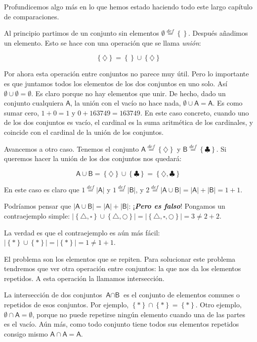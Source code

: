 \documentclass{amsart}
\theoremstyle{definition}
\theoremstyle{remark}
\numberwithin{equation}{section}
\newcommand{\abs}[1]{\left\lvert#1\right\rvert}
\newcommand{\set}[1]{\left\lbrace{#1}\right\rbrace}
\newcommand{\setsymbol}[1]{\textsf{#1}}
\newcommand{\sA}{\setsymbol{A}}
\newcommand{\sB}{\setsymbol{B}}
\newcommand{\card}[1]{\abs{#1}}
\newcommand{\defin}{\overset {def}{=}}
\begin{document}
	Profundicemos algo más en lo que hemos estado haciendo todo este largo 
capítulo de comparaciones.


	Al principio partimos de un conjunto sin elementos $\emptyset \defin 
\set{}$. Después añadimos un elemento. Esto se hace con una operación que se 
llama \emph{unión}:

$$
\set{\diamondsuit} = \set{} \cup \set{\diamondsuit}
$$


	Por ahora esta operación entre conjuntos no parece muy útil. Pero lo 
importante es que juntamos todos los elementos de los dos conjuntos en uno 
solo. Así $\emptyset \cup \emptyset = \emptyset$. Es claro porque no hay 
elementos que unir. De hecho, dado un conjunto cualquiera $\sA$, la unión con 
el vacío no hace nada, $\emptyset \cup \sA = \sA$. Es como sumar cero, $1+0 = 
1$ y $0 + 163749 = 163749$. En este caso concreto, cuando uno de los dos 
conjuntos es vacío, el cardinal es la suma aritmética de los cardinales, y 
coincide con el cardinal de la unión de los conjuntos.


	Avancemos a otro caso. Tenemos el conjunto $\sA \defin 
\set{\diamondsuit}$ y $\sB \defin \set{\clubsuit}$. Si queremos hacer la 
unión de los dos conjuntos nos quedará:


$$
\sA\cup\sB = \set{\diamondsuit}\cup\set{\clubsuit} = 
\set{\diamondsuit,\clubsuit}
$$


	En este caso es claro que $1 \defin \card{\sA}$ y $1 \defin \card{\sB}$, 
y $2 \defin \card{\sA\cup\sB} = \card{\sA}+\card{\sB} = 1 + 1$.


	Podríamos pensar que $\card{\sA\cup\sB}=\card{\sA}+\card{\sB}$: 
¡\textbf{\emph{Pero es falso}}! Pongamos un contraejemplo simple: $\card{ 
\set{ \triangle, \square} \cup \set{ \triangle, \bigcirc}} = \card{ \set{ 
\triangle,\square,\bigcirc} }=3\neq 2 + 2$.


	La verdad es que el contraejemplo es aún más fácil: $\card{ \set{*} \cup 
\set{*}} = \card{ \set{*} } = 1 \neq 1 + 1$.


	El problema son los elementos que se repiten. Para solucionar este 
problema tendremos que ver otra operación entre conjuntos: la que nos da los 
elementos repetidos. A esta operación la llamamos intersección.


	La intersección de dos conjuntos $\sA\cap\sB$ es el conjunto de elementos 
comunes o repetidos de esos conjuntos. Por ejemplo, $\set{*}\cap\set{*} = 
\set{*}$. Otro ejemplo, $\emptyset \cap \sA =  \emptyset$, porque no puede 
repetirse ningún elemento cuando una de las partes es el vacío. Aún más, como 
todo conjunto tiene todos sus elementos repetidos consigo mismo $\sA \cap \sA 
= \sA$.
\end{document}
